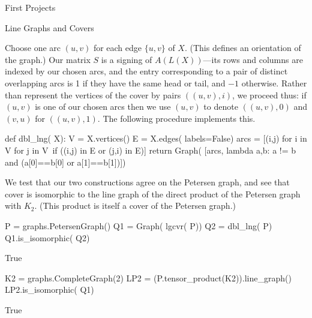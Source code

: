 \begin{chap}{First Projects}
\begin{sect}{Line Graphs and Covers}
\begin{para}
Choose one arc $(u,v)$ for each edge $\{u,v\}$ of $X$. (This defines an orientation
of the graph.) Our matrix $S$ is a signing of $A(L(X))$---its rows and columns
are indexed by our chosen arcs, and the entry corresponding to a pair
of distinct overlapping arcs is 1 if they have the same head or tail,
and $-1$ otherwise. Rather than represent the vertices of the cover by
pairs $((u,v),i)$, we proceed thus: if $(u,v)$ is one of our chosen
arcs then we use $(u,v)$ to denote $((u,v),0)$ and $(v,u)$ for $((u,v),1)$.
The following procedure implements this.
\end{para}
%
\begin{sagecode}
\begin{sageinput}
def dbl_lng( X):
    V = X.vertices()
    E = X.edges( labels=False)
    arcs = [(i,j) for i in V for j in V\
        if ((i,j) in E or (j,i) in E)]
    return  Graph( [arcs, lambda a,b: a != b and (a[0]==b[0] or a[1]==b[1])])
\end{sageinput}
\end{sagecode}
%
\begin{para}
We test that our two constructions agree on the Petersen graph, and see
that cover is isomorphic to the line graph of the direct product of
the Petersen graph with $K_2$. (This product is itself a cover of the Petersen
graph.)
\end{para}
%
\begin{sagecode}
\begin{sageinput}
P = graphs.PetersenGraph()
Q1 = Graph( lgcvr( P))
Q2 = dbl_lng( P)
Q1.is_isomorphic( Q2)
\end{sageinput}
\begin{sageoutput}
True
\end{sageoutput}
\end{sagecode}
%
\begin{sagecode}
\begin{sageinput}
K2 = graphs.CompleteGraph(2)
LP2 = (P.tensor_product(K2)).line_graph()
LP2.is_isomorphic( Q1)
\end{sageinput}
\begin{sageoutput}
True
\end{sageoutput}
\end{sagecode}
%
\end{sect}
%
\end{chap}
